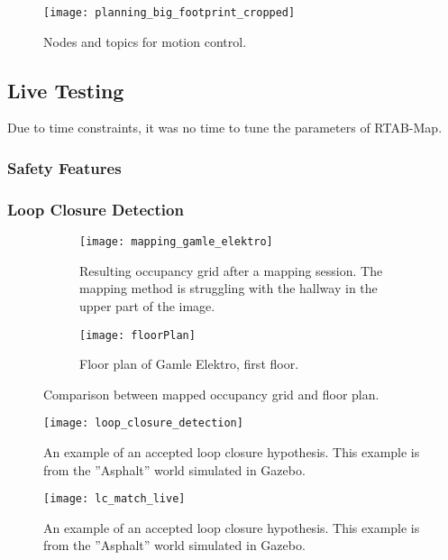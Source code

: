 \begin{figure}[p]
	\centering
	\texttt{[image: planning\_big\_footprint\_cropped]}
	\caption{Nodes and topics for motion control. }
	\label{fig:big_footprint}
\end{figure}



\subsection{Live Testing}

Due to time constraints, it was no time to tune the parameters of \ac{RTAB-Map}.

\subsubsection{Safety Features}

\subsubsection{Loop Closure Detection}

\begin{figure}
	\centering
	\begin{subfigure}[b]{1\textwidth}
		\texttt{[image: mapping\_gamle\_elektro]}
		\caption{Resulting occupancy grid after a mapping session. The mapping  method is struggling with the  hallway in the upper part of the image.}
		\label{fig:mapping_gamle_elektro}
	\end{subfigure}
	\begin{subfigure}[b]{1\textwidth}
		\texttt{[image: floorPlan]}
		\caption{Floor plan of Gamle Elektro, first floor.}
		\label{fig:floorPlan}
	\end{subfigure}
	\caption{Comparison between mapped occupancy grid and floor plan.}
\end{figure}

\begin{figure}[p]
	\centering
	\texttt{[image: loop\_closure\_detection]}
	\caption{An example of an accepted loop closure hypothesis. This example is from the ''Asphalt'' world simulated in Gazebo.}
	\label{fig:loop_closure_detection}
\end{figure}

\begin{figure}[p]
	\centering
	\texttt{[image: lc\_match\_live]}
	\caption{An example of an accepted loop closure hypothesis. This example is from the ''Asphalt'' world simulated in Gazebo.}
	\label{fig:lc_match_live}
\end{figure}

